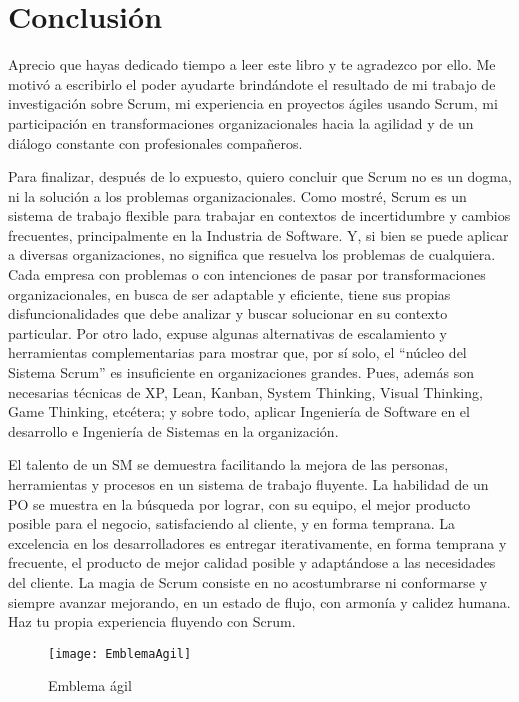 \chapter{Conclusión}

Aprecio que hayas dedicado tiempo a leer este libro y te agradezco por ello. Me motivó a escribirlo el poder ayudarte brindándote el resultado de mi trabajo de investigación sobre Scrum, mi experiencia en proyectos ágiles usando Scrum, mi participación en transformaciones organizacionales hacia la agilidad y de un diálogo constante con profesionales compañeros. 

Para finalizar, después de lo expuesto, quiero concluir que Scrum no es un dogma, ni la solución a los problemas organizacionales. Como mostré, Scrum es un sistema de trabajo flexible para trabajar en contextos de incertidumbre y cambios frecuentes, principalmente en la Industria de Software. Y, si bien se puede aplicar a diversas organizaciones, no significa que resuelva los problemas de cualquiera. Cada empresa con problemas o con intenciones de pasar por transformaciones organizacionales, en busca de ser adaptable y eficiente, tiene sus propias disfuncionalidades que debe analizar y buscar solucionar en su contexto particular. Por otro lado, expuse algunas alternativas de escalamiento y herramientas complementarias para mostrar que, por sí solo, el “núcleo del Sistema Scrum” es insuficiente en organizaciones grandes. Pues, además son necesarias técnicas de XP, Lean, Kanban, System Thinking, Visual Thinking, Game Thinking, etcétera; y sobre todo, aplicar Ingeniería de Software en el desarrollo e Ingeniería de Sistemas en la organización.

El talento de un SM se demuestra facilitando la mejora de las personas, herramientas y procesos en un sistema de trabajo fluyente. La habilidad de un PO se muestra en la búsqueda por lograr, con su equipo, el mejor producto posible para el negocio, satisfaciendo al cliente, y en forma temprana. La excelencia en los desarrolladores es entregar iterativamente, en forma temprana y frecuente, el producto de mejor calidad posible y adaptándose a las necesidades del cliente. La magia de Scrum consiste en no acostumbrarse ni conformarse y siempre avanzar mejorando, en un estado de flujo, con armonía y calidez humana. Haz tu propia experiencia fluyendo con Scrum.

\begin{figure}[h]
  \centering
  \texttt{[image: EmblemaAgil]}
  \caption{Emblema ágil}
  \centering
  \label{fig:EmblemaAgil} %
\end{figure}

